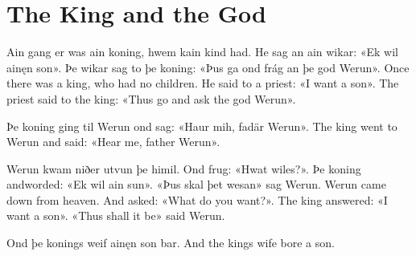 \section{The King and the God}

\begin{paracol}{2}
Ain gang er was ain koning, hwem kain kind had. He sag an ain wikar: «Ek wil ainęn son». Þe wikar sag to þe koning: «Þus ga ond frág an þe god Werun».
\switchcolumn
Once there was a king, who had no children. He said to a priest: «I want a son». The priest said to the king: «Thus go and ask the god Werun».
\end{paracol}
\begin{paracol}{2}
Þe koning ging til Werun ond sag: «Haur mih, fadär Werun».
\switchcolumn
The king went to Werun and said: «Hear me, father Werun».
\end{paracol}
\begin{paracol}{2}
Werun kwam niðer utvun þe himil. Ond frug: «Hwat wiles?». Þe koning andworded: «Ek wil ain sun». «Þus skal þet wesan» sag Werun.
\switchcolumn
Werun came down from heaven. And asked: «What do you want?». The king answered: «I want a son». «Thus shall it be» said Werun.
\end{paracol}

\begin{paracol}{2}
Ond þe konings weif ainęn son bar.
\switchcolumn
And the kings wife bore a son.
\end{paracol}
